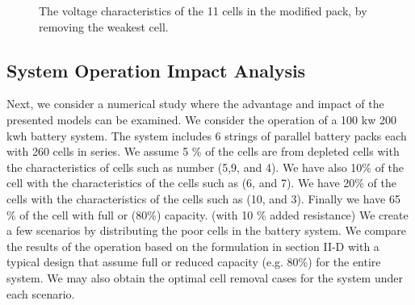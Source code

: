 \documentclass[10pt,twocolumn]{IEEEtran}
\begin{document}
\begin{figure}
\centering
\vspace{-0.2cm}
{} \vspace{-0.1cm}
\caption{The voltage characteristics of the 11 cells in the modified pack,  by removing the weakest cell. }
\vspace{-0.3cm}
\label{fig:cell_removal3}
\end{figure} 

\subsection{System Operation Impact Analysis }

Next, we consider a numerical study where the advantage and impact of the presented models can be examined.
We consider the operation of a 100 kw 200 kwh battery system.
The system includes 6 strings of parallel battery packs each with 260 cells in series.
We assume 5 \% of the cells are from depleted cells with the characteristics of  cells such as number (5,9, and 4).
We have also 10\% of the cell with the characteristics of the cells such as (6, and 7).
We have 20\% of the cells with the characteristics of the cells such as (10, and 3).
Finally we have 65 \% of the cell with full or (80\%) capacity. (with 10 \% added resistance)
We create a few scenarios by  distributing  the poor cells in the battery system.
We compare the results of the operation based on the formulation in section II-D with a typical design that assume full or reduced capacity (e.g. 80\%) for the entire system.
We may also obtain the optimal cell removal cases for the system under each scenario.
\end{document}
